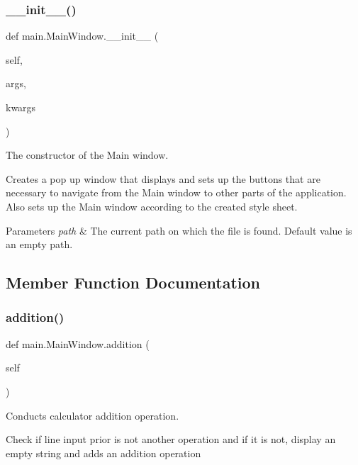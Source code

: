 \subsubsection{\texorpdfstring{\+\_\+\+\_\+init\+\_\+\+\_\+()}{\_\_init\_\_()}}
{\footnotesize\ttfamily def main.\+Main\+Window.\+\_\+\+\_\+init\+\_\+\+\_\+ (\begin{DoxyParamCaption}\item[{}]{self,  }\item[{}]{args,  }\item[{}]{kwargs }\end{DoxyParamCaption})}



The constructor of the Main window. 

Creates a pop up window that displays and sets up the buttons that are necessary to navigate from the Main window to other parts of the application. Also sets up the Main window according to the created style sheet. 
\begin{DoxyParams}{Parameters}
{\em path} & The current path on which the file is found. Default value is an empty path. \\
\hline
\end{DoxyParams}


\subsection{Member Function Documentation}
\mbox{\label{classmain_1_1_main_window_ad3673a13020c18149857ca57cbd13303}} 
\subsubsection{\texorpdfstring{addition()}{addition()}}
{\footnotesize\ttfamily def main.\+Main\+Window.\+addition (\begin{DoxyParamCaption}\item[{}]{self }\end{DoxyParamCaption})}



Conducts calculator addition operation. 

Check if line input prior is not another operation and if it is not, display an empty string and adds an addition operation \mbox{\label{classmain_1_1_main_window_a86f6db688a227bf7a9228ef5ab650d31}} 
